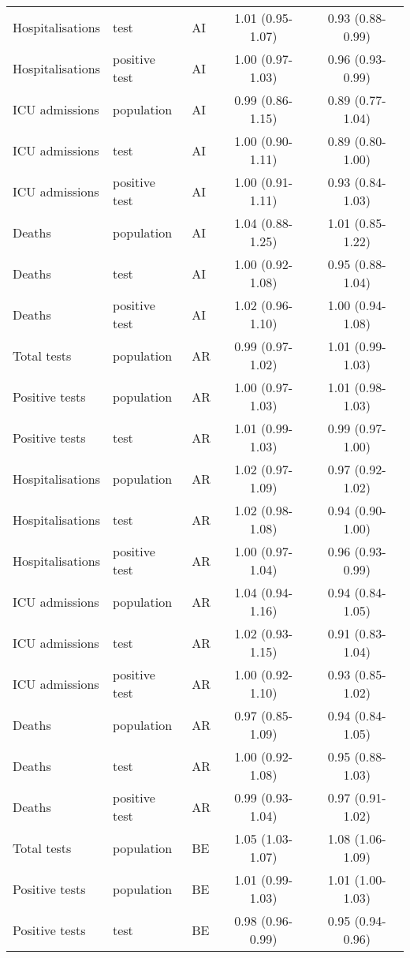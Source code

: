 \documentclass{article}
\begin{document}
\begin{longtable}{lllcc}
		Hospitalisations & test & AI & 1.01 (0.95-1.07) & 0.93 (0.88-0.99) \\ 
		Hospitalisations & positive test & AI & 1.00 (0.97-1.03) & 0.96 (0.93-0.99) \\ 
		ICU admissions & population & AI & 0.99 (0.86-1.15) & 0.89 (0.77-1.04) \\ 
		ICU admissions & test & AI & 1.00 (0.90-1.11) & 0.89 (0.80-1.00) \\ 
		ICU admissions & positive test & AI & 1.00 (0.91-1.11) & 0.93 (0.84-1.03) \\ 
		Deaths & population & AI & 1.04 (0.88-1.25) & 1.01 (0.85-1.22) \\ 
		Deaths & test & AI & 1.00 (0.92-1.08) & 0.95 (0.88-1.04) \\ 
		Deaths & positive test & AI & 1.02 (0.96-1.10) & 1.00 (0.94-1.08) \\ 
		Total tests & population & AR & 0.99 (0.97-1.02) & 1.01 (0.99-1.03) \\ 
		Positive tests & population & AR & 1.00 (0.97-1.03) & 1.01 (0.98-1.03) \\ 
		Positive tests & test & AR & 1.01 (0.99-1.03) & 0.99 (0.97-1.00) \\ 
		Hospitalisations & population & AR & 1.02 (0.97-1.09) & 0.97 (0.92-1.02) \\ 
		Hospitalisations & test & AR & 1.02 (0.98-1.08) & 0.94 (0.90-1.00) \\ 
		Hospitalisations & positive test & AR & 1.00 (0.97-1.04) & 0.96 (0.93-0.99) \\ 
		ICU admissions & population & AR & 1.04 (0.94-1.16) & 0.94 (0.84-1.05) \\ 
		ICU admissions & test & AR & 1.02 (0.93-1.15) & 0.91 (0.83-1.04) \\ 
		ICU admissions & positive test & AR & 1.00 (0.92-1.10) & 0.93 (0.85-1.02) \\ 
		Deaths & population & AR & 0.97 (0.85-1.09) & 0.94 (0.84-1.05) \\ 
		Deaths & test & AR & 1.00 (0.92-1.08) & 0.95 (0.88-1.03) \\ 
		Deaths & positive test & AR & 0.99 (0.93-1.04) & 0.97 (0.91-1.02) \\ 
		Total tests & population & BE & 1.05 (1.03-1.07) & 1.08 (1.06-1.09) \\ 
		Positive tests & population & BE & 1.01 (0.99-1.03) & 1.01 (1.00-1.03) \\ 
		Positive tests & test & BE & 0.98 (0.96-0.99) & 0.95 (0.94-0.96) \\ 

\end{longtable}
\end{document}
